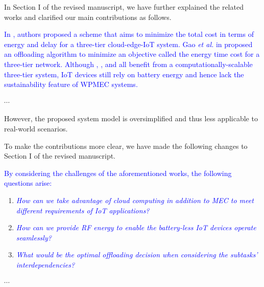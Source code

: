 \documentclass[12pt,draftclsnofoot,onecolumn]{IEEEtran}
\newcommand{\rev}[1]{{\color{blue}#1}} %
\newcommand{\rev}[1]{#1}
\newenvironment{my}[2]%
{\begin{list}{}%
{\setlength{\rightmargin}{#1}\setlength{\leftmargin}{#2}}%


 \item[]{}

} {\end{list}}
\begin{document}
\begin{enumerate}
In Section I of the revised manuscript, we have further explained the related works and clarified our main contributions as follows.\\

\begin{my}{1cm}{1cm}
	\rev{
		\textcolor{blue}{In \cite{b39}, authors proposed a scheme that aims to minimize the total cost in terms of energy and delay for a three-tier cloud-edge-IoT system. Gao \textit{et al.} in \cite{b40} proposed an offloading algorithm to minimize an objective called the energy time cost for a three-tier network. Although \cite{b5}, \cite{b39}, and \cite{b40} all benefit from a computationally-scalable three-tier system, IoT devices still rely on battery energy and hence lack the sustainability feature of WPMEC systems.}
		
		$\cdots$
		
		However, the proposed system model is oversimplified and thus less applicable to real-world scenarios.\\
	}
\end{my}

To make the contributions more clear, we have made the following changes to Section I of the revised manuscript.\\

\begin{my}{1cm}{1cm}
	\rev{\textcolor{blue}{By considering the challenges of the aforementioned works, the following questions arise:}
\begin{enumerate}
	\item \textcolor{blue}{\textit{How can we take advantage of cloud computing in addition to MEC to meet different requirements of IoT applications?}}
	\item \textcolor{blue}{\textit{How can we provide RF energy to enable the battery-less IoT devices operate seamlessly?}}
	\item \textcolor{blue}{\textit{What would be the optimal offloading decision when considering the subtasks' interdependencies?}}
\end{enumerate}
	
$\cdots$	
	
	
	
}
\end{my}
\end{enumerate}
\end{document}

